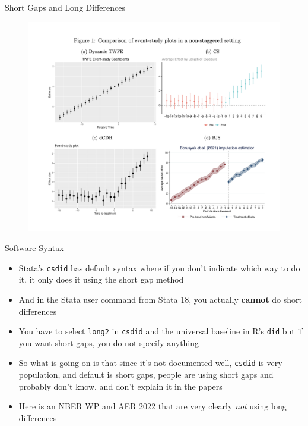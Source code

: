 \documentclass{beamer}
\begin{document}
\begin{frame}{Short Gaps and Long Differences}

\begin{figure}[h]
    \centering
    \includegraphics[width=\linewidth, height=0.8\textheight, keepaspectratio]{./lecture_includes/shortgap}
\end{figure}

\end{frame}

\begin{frame}{Software Syntax}

\begin{itemize}

\item Stata's \texttt{csdid} has default syntax where if you don't indicate which way to do it, it only does it using the short gap method
\item And in the Stata user command from Stata 18, you actually \textbf{cannot} do short differences 
\item You have to select \texttt{long2} in \texttt{csdid} and the universal baseline in R's \texttt{did} but if you want short gaps, you do not specify anything
\item So what is going on is that since it's not documented well, \texttt{csdid} is very population, and default is short gaps, people are using short gaps and probably don't know, and don't explain it in the papers
\item Here is an NBER WP and AER 2022 that are very clearly \emph{not} using long differences
\end{itemize}

\end{frame}
\end{document}

